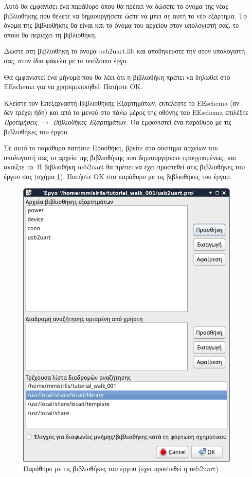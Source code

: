\documentclass[a4paper]{article}
\begin{document}
Αυτό θα εμφανίσει ένα παράθυρο όπου θα πρέπει να δώσετε το όνομα της νέας βιβλιοθήκης που θέλετε να δημιουργήσετε ώστε να μπει σε αυτή το νέο εξάρτημα. Το όνομα της βιβλιοθήκης θα είναι και το όνομα του αρχείου στον υπολογιστή σας, το οποίο θα περιέχει τη βιβλιοθήκη. 

Δώστε στη βιβλιοθήκη το όνομα \textenglish{usb2uart.lib} και αποθηκεύστε την στον υπολογιστή σας, στον ίδιο φάκελο με το υπόλοιπο έργο.

Θα εμφανιστεί ένα μήνυμα που θα λέει ότι η βιβλιοθήκη πρέπει να δηλωθεί στο \textenglish{EEschema} για να χρησιμοποιηθεί. Πατήστε ΟΚ.

Κλείστε τον Επεξεργαστή Βιβλιοθήκης Εξαρτημάτων, εκτελέστε το \textenglish{EEschema} (αν δεν τρέχει ήδη) και από το μενού στο πάνω μέρος της οθόνης του \textenglish{EEschema} επιλέξτε \textit{Προτιμήσεις $\rightarrow$ Βιβλιοθήκες Εξαρτημάτων}. Θα εμφανιστεί ένα παράθυρο με τις βιβλιοθήκες του έργου. 

Σε αυτό το παράθυρο πατήστε Προσθήκη, βρείτε στο σύστημα αρχείων του υπολογιστή σας το αρχείο της βιβλιοθήκης που δημιουργήσατε προηγουμένως, και ανοίξτε το. Η βιβλιοθήκη usb2uart θα πρέπει να έχει προστεθεί στις βιβλιοθήκες του έργου σας (σχήμα \ref{fig:libed-dial-libs}). Πατήστε ΟΚ στο παράθυρο με τις βιβλιοθήκες του έργου.

\begin{figure}
  \begin{center}
    \includegraphics[width=.5\textwidth]{img/libed-dial-libs.png}
    \caption{Παράθυρο με τις βιβλιοθήκες του έργου (έχει προστεθεί η usb2uart)}
    \label{fig:libed-dial-libs}
  \end{center}
\end{figure}
\end{document}
